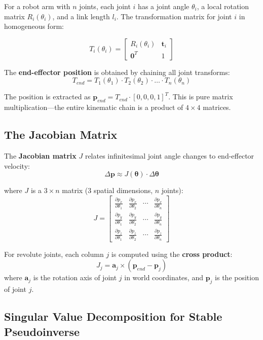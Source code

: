 \documentclass[11pt]{article}
\begin{document}
For a robot arm with $n$ joints, each joint $i$ has a joint angle $\theta_i$, a local rotation matrix $R_i(\theta_i)$, and a link length $l_i$. The transformation matrix for joint $i$ in homogeneous form:

\[
T_i(\theta_i) = \begin{bmatrix} R_i(\theta_i) & \mathbf{t}_i \\ \mathbf{0}^T & 1 \end{bmatrix}
\]

The \textbf{end-effector position} is obtained by chaining all joint transforms:
\[
T_{end} = T_1(\theta_1) \cdot T_2(\theta_2) \cdot \ldots \cdot T_n(\theta_n)
\]

The position is extracted as $\mathbf{p}_{end} = T_{end} \cdot [0, 0, 0, 1]^T$. This is pure matrix multiplication---the entire kinematic chain is a product of $4 \times 4$ matrices.

\subsection{The Jacobian Matrix}

The \textbf{Jacobian matrix} $J$ relates infinitesimal joint angle changes to end-effector velocity:
\[
\Delta \mathbf{p} \approx J(\boldsymbol{\theta}) \cdot \Delta \boldsymbol{\theta}
\]

where $J$ is a $3 \times n$ matrix ($3$ spatial dimensions, $n$ joints):
\[
J = \begin{bmatrix}
\frac{\partial p_x}{\partial \theta_1} & \frac{\partial p_x}{\partial \theta_2} & \cdots & \frac{\partial p_x}{\partial \theta_n} \\[4pt]
\frac{\partial p_y}{\partial \theta_1} & \frac{\partial p_y}{\partial \theta_2} & \cdots & \frac{\partial p_y}{\partial \theta_n} \\[4pt]
\frac{\partial p_z}{\partial \theta_1} & \frac{\partial p_z}{\partial \theta_2} & \cdots & \frac{\partial p_z}{\partial \theta_n}
\end{bmatrix}
\]

For revolute joints, each column $j$ is computed using the \textbf{cross product}:
\[
J_j = \mathbf{a}_j \times (\mathbf{p}_{end} - \mathbf{p}_j)
\]
where $\mathbf{a}_j$ is the rotation axis of joint $j$ in world coordinates, and $\mathbf{p}_j$ is the position of joint $j$.

\subsection{Singular Value Decomposition for Stable Pseudoinverse}
\end{document}
